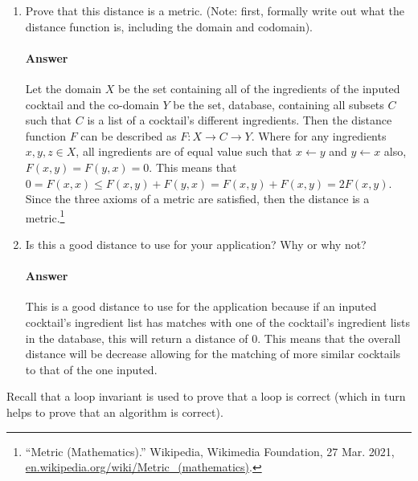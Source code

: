 \documentclass{article}
\begin{document}
\begin{enumerate}

    \item Prove that this distance is a metric. (Note: first, formally write out
        what the distance function is, including the domain and codomain).

        \paragraph{Answer}

        Let the domain $X$ be the set containing all of the ingredients of the inputed cocktail and the co-domain $Y$ be the set, database, containing all subsets $C$ such that $C$ is a list of a cocktail's different ingredients. Then the distance function $F$ can be described as $F: X \rightarrow C \rightarrow Y$. Where for any ingredients $x,y,z \in X$, all ingredients are of equal value such that $x \gets y$ and $y \gets x$ also, $F(x,y)= F(y,x)=0$. This means that $0=F(x,x) \leq F(x,y) +F(y,x) = F(x,y) + F(x,y)=2F(x,y)$. Since the three axioms of a metric are satisfied, then the distance is a metric.\footnote{“Metric (Mathematics).” Wikipedia, Wikimedia Foundation, 27 Mar. 2021, \url{en.wikipedia.org/wiki/Metric_(mathematics)}.}

    \item Is this a good distance to use for your application?  Why or why not?

        \paragraph{Answer}

       This is a good distance to use for the application because if an inputed cocktail's ingredient list has matches with one of the cocktail's ingredient lists in the database, this will return a distance of 0. This means that the overall distance will be decrease allowing for the matching of more similar cocktails to that of the one inputed.

\end{enumerate}


 

Recall that a loop invariant is used to prove that a loop is correct (which in
turn helps to prove that an algorithm is correct).
\end{document}
